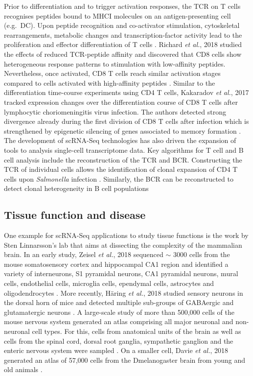 Prior to differentiation and to trigger activation responses, the \gls{TCR} on T cells recognises peptides bound to \gls{MHCI} molecules on an antigen-presenting cell (e.g.~DC). Upon peptide recognition and co-activator stimulation, cytoskeletal rearrangements, metabolic changes and transcription-factor activity lead to the proliferation and effector differentiation of T cells \citep{Richard2018}. Richard \emph{et al.}, 2018 studied the effects of reduced TCR-peptide affinity and discovered that CD8\plus{} cells show heterogeneous response patterns to stimulation with low-affinity peptides. Nevertheless, once activated, CD8\plus{} T cells reach similar activation stages compared to cells activated with high-affinity peptides \citep{Richard2018}. Similar to the differentiation time-course experiments using CD4\plus{} T cells, Kakaradov \emph{et al.}, 2017 tracked expression changes over the differentiation course of CD8\plus{} T cells after lymphocytic choriomeningitis virus infection. The authors detected strong divergence already during the first division of CD8\plus{} T cells after infection which is strengthened by epigenetic silencing of genes associated to memory formation \citep{Kakaradov2017}.\\

The development of scRNA-Seq technologies has also driven the expansion of tools to analysis single-cell transcriptome data. Key algorithms for T cell and B cell analysis include the reconstruction of the TCR and \gls{BCR}. Constructing the TCR of individual cells allows the identification of clonal expansion of CD4\plus{} T cells upon \textit{Salmonella} infection \citep{Stubbington2016}. Similarly, the BCR can be reconstructed to detect clonal heterogeneity in B cell populations \citep{Canzar2017, Wu2018}

\subsection{Tissue function and disease}

One example for scRNA-Seq applications to study tissue functions is the work by Sten Linnarsson's lab that aims at dissecting the complexity of the mammalian brain. In an early study, Zeisel \emph{et al.}, 2018 sequenced $\sim$ 3000 cells from the mouse somatosensory cortex and hippocampal CA1 region and identified a variety of interneurons, S1 pyramidal neurons, CA1 pyramidal neurons, mural cells, endothelial cells, microglia cells, ependymal cells, astrocytes and oligodendrocytes \citep{Zeisel2015}. More recently, H\"a{}ring \emph{et al.}, 2018 studied sensory neurons in the dorsal horn of mice and detected multiple sub-groups of GABAergic and glutamatergic neurons \citep{Haring2018}. A large-scale study of more than 500,000 cells of the mouse nervous system generated an atlas comprising all major neuronal and non-neuronal cell types. For this, cells from anatomical units of the brain as well as cells from the spinal cord, dorsal root ganglia, sympathetic ganglion and the enteric nervous system were sampled \citep{Zeisel2018}. On a smaller cell, Davie \emph{et al.}, 2018 generated an atlas of 57,000 cells from the \gls{Dmelanogaster} brain from young and old animals \cite{Davie2018}.\\

